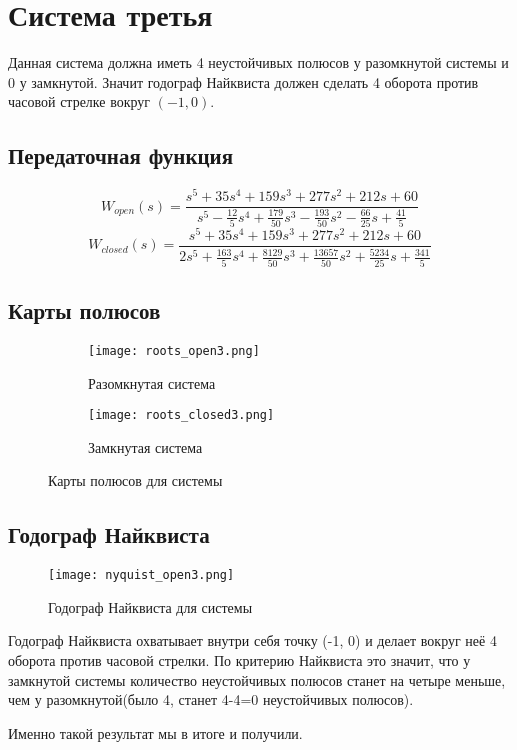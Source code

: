 \section{Система третья}
Данная система должна иметь 4 неустойчивых полюсов у разомкнутой системы и 0 у замкнутой. 
Значит годограф Найквиста должен сделать 4 оборота против часовой стрелке вокруг $(-1, 0)$.
\subsection{Передаточная функция}
$$
W_{open}(s) = \frac{s^5 +35s^4 +159s^3 +277s^2 +212s+60}{s^5 -\frac{12}{5}s^4+\frac{179}{50}s^3-\frac{193}{50}s^2-\frac{66}{25}s+\frac{41}{5}}
$$
$$
W_{closed}(s) = \frac{s^5 +35s^4 +159s^3 +277s^2 +212s+60}{2s^5 +\frac{163}{5}s^4+\frac{8129}{50}s^3+\frac{13657}{50}s^2+\frac{5234}{25}s+\frac{341}{5}}
$$
\subsection{Карты полюсов}
\begin{figure}[h]
  \begin{subfigure}{0.5\textwidth}
    \texttt{[image: roots\_open3.png]} 
    \caption{Разомкнутая система}
  \end{subfigure}
  \begin{subfigure}{0.5\textwidth}
    \texttt{[image: roots\_closed3.png]}
    \caption{Замкнутая система}
  \end{subfigure}
  \caption{Карты полюсов для системы}
\end{figure}

\newpage
\subsection{Годограф Найквиста}
\begin{figure}[ht]
    \centering
    \texttt{[image: nyquist\_open3.png]}
    \caption{Годограф Найквиста для системы}
\end{figure}

Годограф Найквиста охватывает внутри себя точку (-1, 0) и делает вокруг неё 4 оборота против часовой стрелки. 
По критерию Найквиста это значит, что у замкнутой системы количество неустойчивых полюсов станет на четыре меньше, чем у разомкнутой(было 4, станет 4-4=0 неустойчивых полюсов). 

Именно такой результат мы в итоге и получили.

\newpage
